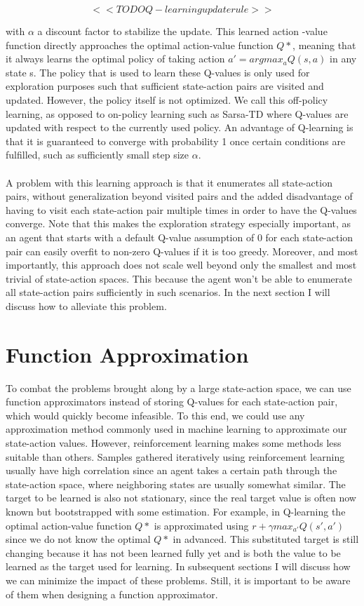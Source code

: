 $$<<TODO Q-learning update rule>>$$

with $\alpha$ a discount factor to stabilize the update.
This learned action	-value function directly approaches
the optimal action-value function $Q*$,
meaning that it always learns the optimal policy
of taking action $a' = argmax_{a}Q(s,a)$
in any state s.
The policy that is used to learn these Q-values
is only used for exploration purposes such that
sufficient state-action pairs are visited
and updated.
However, the policy itself is not optimized.
We call this off-policy learning,
as opposed to on-policy learning such as Sarsa-TD
where Q-values are updated with respect to
the currently used policy.
An advantage of Q-learning
is that it is guaranteed to converge
with probability 1
once certain conditions are fulfilled,
such as sufficiently small step size $\alpha$.

\paragraph{}
A problem with this learning approach is that
it enumerates all state-action pairs,
without generalization beyond visited pairs
and the added disadvantage of having to visit
each state-action pair multiple times
in order to have the Q-values converge.
Note that this makes the exploration strategy especially important,
as an agent that starts with a default Q-value assumption of 0
for each state-action pair can easily overfit
to non-zero Q-values if it is too greedy.
Moreover, and most importantly,
this approach does not scale well beyond only the smallest and most trivial
of state-action spaces.
This because the agent won't be able to enumerate all state-action pairs
sufficiently in such scenarios.
In the next section I will discuss how to alleviate this problem.

\section{Function Approximation}
To combat the problems brought along by a large state-action space,
we can use function approximators instead of storing Q-values
for each state-action pair,
which would quickly become infeasible.
To this end,
we could use any approximation method commonly used in machine learning
to approximate our state-action values.
However, reinforcement learning makes some methods
less suitable than others.
Samples gathered iteratively using reinforcement learning
usually have high correlation since an agent
takes a certain path through
the state-action space,
where neighboring states are usually somewhat similar.
The target to be learned is also not stationary,
since the real target value is often now known
but bootstrapped with some estimation.
For example,
in Q-learning the optimal action-value function $Q*$
is approximated using $r+\gamma max_{a'}Q(s',a')$
since we do not know the optimal $Q*$ in advanced.
This substituted target is still changing
because it has not been learned fully yet
and is both the value to be learned
as the target used for learning.
In subsequent sections I will discuss
how we can minimize the impact of these problems.
Still, it is important to be aware of them
when designing a function approximator.


